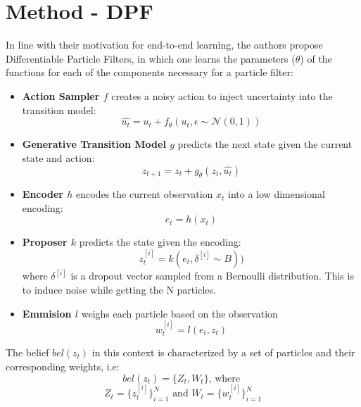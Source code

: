 \documentclass[10pt,twocolumn,letterpaper]{article}
\begin{document}
	\section{Method - DPF}
	In line with their motivation for end-to-end learning, the authors propose Differentiable Particle Filters, in which one learns the parameters ($\theta$) of the functions for each of the components necessary for a particle filter:
	\begin{itemize}
		\item \textbf{Action Sampler $f$} creates a noisy action to inject uncertainty into the transition model:		
			\begin{equation} \label{eq:dpf_as}
			\hat{u_t} = u_t + f_{\theta}(u_t, \epsilon \sim \mathcal{N}(0,1))
			\end{equation}
		\item \textbf{Generative Transition Model $g$} predicts the next state given the current state and action:
			\begin{equation} \label{eq:dpf_gp}
			z_{t+1} = z_{t} + g_{\theta}(z_{t}, \hat{u_{t}})
			\end{equation}
		\item \textbf{Encoder $h$} encodes the current observation $x_t$ into a low dimensional encoding:
			\begin{equation}
			e_t = h(x_t)
			\end{equation}
		\item \textbf{Proposer $k$} predicts the state given the encoding:
			\begin{equation}
			z^{[i]}_t = k(e_t, \delta^{[i]} \sim B))
			\end{equation}
			where $\delta^{[i]}$ is a dropout vector sampled from a Bernoulli distribution. This is to induce noise while getting the N particles.
		\item \textbf{Emmision $l$} weighs each particle based on the observation
			\begin{equation} \label{eq:dpf_wts}
			w^{[i]}_t = l(e_t, z_t)
			\end{equation}
	\end{itemize}
	
	The belief $bel(z_t)$ in this context is characterized by a set of particles and their corresponding weights, i.e:
	\begin{equation}
		bel(z_t) = \{ Z_t, W_t \} \text{, where } 
	\end{equation}
	\begin{equation*}
		Z_t = \{z^{[i]}_t\}_{i=1}^N \text{ and } W_t = \{w^{[i]}_t\}_{i=1}^N
	\end{equation*}
	
\end{document}
